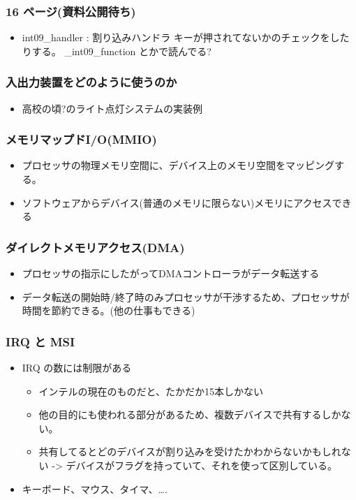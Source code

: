 \documentclass{jsarticle}
\begin{document}
\subsubsection{16 ページ(資料公開待ち)}

\begin{itemize}
\item
  int09\_handler : 割り込みハンドラ
  キーが押されてないかのチェックをしたりする。 \_int09\_function
  とかで読んでる?
\end{itemize}
\subsubsection{入出力装置をどのように使うのか}

\begin{itemize}
\item
  高校の頃?のライト点灯システムの実装例
\end{itemize}
\subsubsection{メモリマップドI/O(MMIO)}

\begin{itemize}
\item
  プロセッサの物理メモリ空間に、デバイス上のメモリ空間をマッピングする。
\item
  ソフトウェアからデバイス(普通のメモリに限らない)メモリにアクセスできる
\end{itemize}
\subsubsection{ダイレクトメモリアクセス(DMA)}

\begin{itemize}
\item
  プロセッサの指示にしたがってDMAコントローラがデータ転送する
\item
  データ転送の開始時/終了時のみプロセッサが干渉するため、プロセッサが時間を節約できる。(他の仕事もできる)
\end{itemize}
\subsubsection{IRQ と MSI}

\begin{itemize}
\item
  IRQ の数には制限がある
  \begin{itemize}
  \item
    インテルの現在のものだと、たかだか15本しかない
  \item
    他の目的にも使われる部分があるため、複数デバイスで共有するしかない。
  \item
    共有してるとどのデバイスが割り込みを受けたかわからないかもしれない
    -\textgreater{}
    デバイスがフラグを持っていて、それを使って区別している。
  \end{itemize}
\item
  キーボード、マウス、タイマ、\ldots{}.
\end{itemize}
\end{document}
